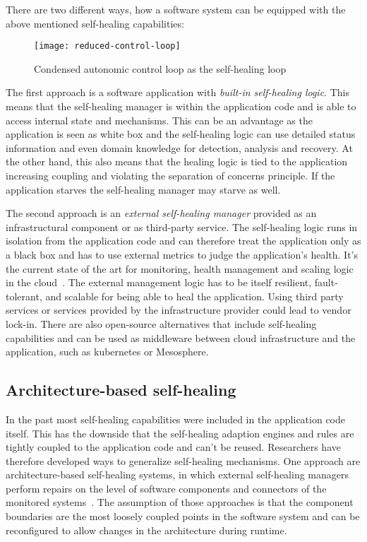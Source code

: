   There are two different ways, how a software system can be equipped with the above mentioned self-healing capabilities:

  \begin{figure}
    \centering
    \texttt{[image: reduced-control-loop]}
    \caption{Condensed autonomic control loop as the self-healing loop}
    \label{fig:self-healing-loop}
  \end{figure}

  The first approach is a software application with \textit{built-in self-healing logic}.
  This means that the self-healing manager is within the application code and is able to access internal state and mechanisms.
  This can be an advantage as the application is seen as white box and the self-healing logic can use detailed status information and even domain knowledge for detection, analysis and recovery.
  At the other hand, this also means that the healing logic is tied to the application increasing coupling and violating the separation of concerns principle.
  If the application starves the self-healing manager may starve as well.

  The second approach is an \textit{external self-healing manager} provided as an infrastructural component or as third-party service.
  The self-healing logic runs in isolation from the application code and can therefore treat the application only as a black box and has to use external metrics to judge the application's health.
  It's the current state of the art for monitoring, health management and scaling logic in the cloud~\cite{ToffettiMicroservices}.
  The external management logic has to be itself resilient, fault-tolerant, and scalable for being able to heal the application.
  Using third party services or services provided by the infrastructure provider could lead to vendor lock-in.
  There are also open-source alternatives that include self-healing capabilities and can be used as middleware between cloud infrastructure and the application, such as \gls{kubernetes} or Mesosphere.

\subsection{Architecture-based self-healing}
  In the past most self-healing capabilities were included in the application code itself.
  This has the downside that the self-healing adaption engines and rules are tightly coupled to the application code and can't be reused.
  Researchers have therefore developed ways to generalize self-healing mechanisms.
  One approach are architecture-based self-healing systems, in which external self-healing managers perform repairs on the level of software components and connectors of the monitored systems~\cite{DashofyArchitecture}.
  The assumption of those approaches is that the component boundaries are the most loosely coupled points in the software system and can be reconfigured to allow changes in the architecture during runtime.

